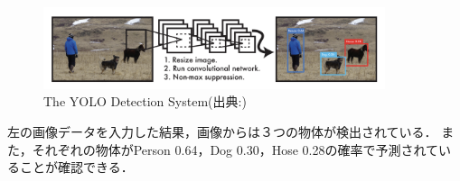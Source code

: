 \documentclass[../main]{subfiles}
\begin{document}
        \begin{figure}[H]
        \centering
        \includegraphics[width=10cm]{../images/yolo_exp.png}
        \caption{The YOLO Detection System(出典:\cite{yolo_paper_v1})}
        \label{figure::yolo_exp}
        \end{figure}
        左の画像データを入力した結果，画像からは３つの物体が検出されている．
        また，それぞれの物体がPerson 0.64，Dog 0.30，Hose 0.28の確率で予測されていることが確認できる．
    
\end{document}
